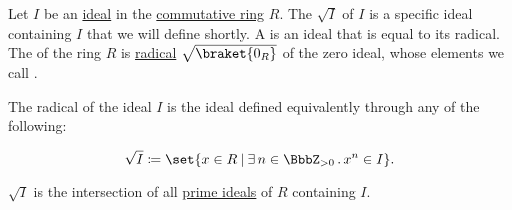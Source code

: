\begin{definition}\label{def:radical_ideal}
  Let \( I \) be an \hyperref[def:semiring_ideal]{ideal} in the \hyperref[def:ring/commutative]{commutative ring} \( R \). The  \( \sqrt I \) of \( I \) is a specific ideal containing \( I \) that we will define shortly. A  is an ideal that is equal to its radical. The  of the ring \( R \) is \hyperref[def:radical_ideal]{radical} \( \sqrt {\braket{ 0_R }} \) of the zero ideal, whose elements we call .

  The radical of the ideal \( I \) is the ideal defined equivalently through any of the following:
  \begin{thmenum}
    \begin{equation}\label{eq:def:radical_ideal/direct}
      \sqrt I \coloneqq \set{ x \in R \given \qexists {n \in \BbbZ_{>0}} x^n \in I }.
    \end{equation}

     \( \sqrt I \) is the intersection of all \hyperref[def:semiring_ideal/prime]{prime ideals} of \( R \) containing \( I \).
  \end{thmenum}
\end{definition}
